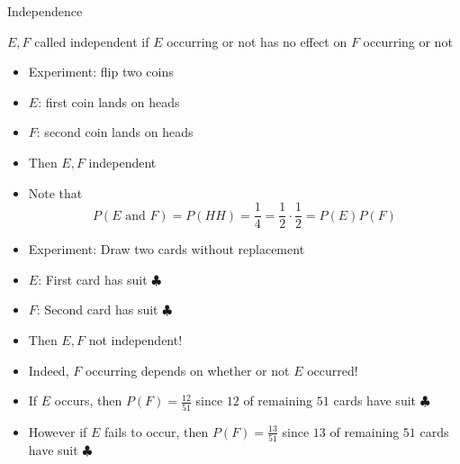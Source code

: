 \documentclass{beamer}
\theoremstyle{definition}
\begin{document}
\begin{frame}{Independence}
\begin{definition}
$E,F$ called \alert{independent} if $E$
occurring or not has no effect on $F$ occurring or not
\end{definition}
\begin{example}
\begin{itemize}
\item Experiment: flip two coins
\item $E$: first coin lands on heads
\item $F$: second coin lands on heads
\item Then $E,F$ independent
\item Note that 
\[P\left(\text{$E$ and $F$}\right)=P\left(HH\right)
=\frac{1}{4}
=\frac{1}{2}\cdot\frac{1}{2}=P\left(E\right)P\left(F\right)\]
\end{itemize}
\end{example}
\end{frame}

\begin{frame}
\begin{example}
\begin{itemize}
\item Experiment: Draw two cards without replacement
\item $E$: First card has suit $\clubsuit$
\item $F$: Second card has suit $\clubsuit$
\item Then $E,F$ \alert{not} independent!
\item Indeed, $F$ occurring depends on whether or not
$E$ occurred!
\item If $E$ occurs, then $P\left(F\right)=\frac{12}{51}$
since $12$ of remaining $51$ cards have suit $\clubsuit$
\item However if $E$ fails to occur, then $P\left(F\right)=\frac{13}{51}$
since $13$ of remaining $51$ cards have suit $\clubsuit$
\end{itemize}
\end{example}
\end{frame}
\end{document}
